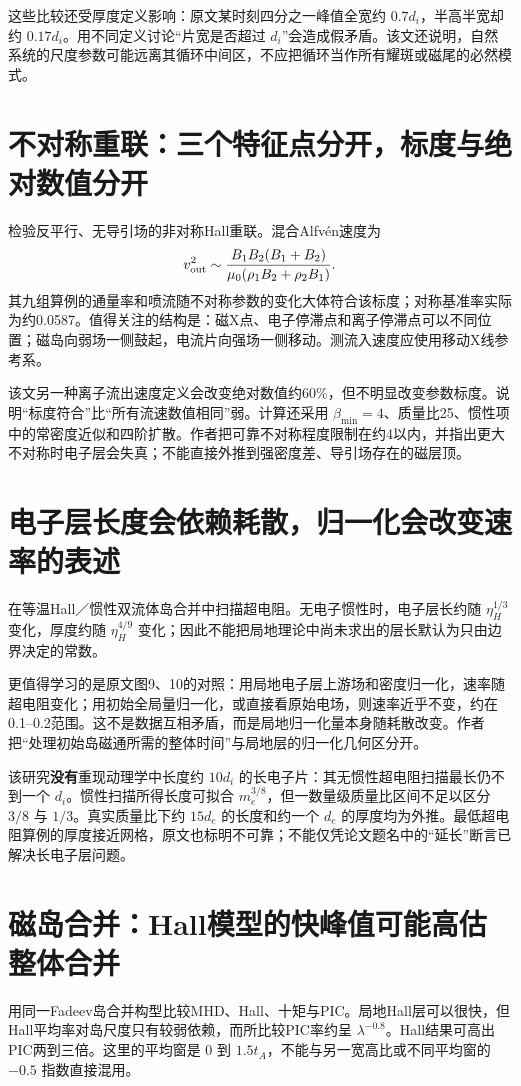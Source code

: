 这些比较还受厚度定义影响：原文某时刻四分之一峰值全宽约 $0.7d_i$，半高半宽却约 $0.17d_i$。用不同定义讨论“片宽是否超过 $d_i$”会造成假矛盾。该文还说明，自然系统的尺度参数可能远离其循环中间区，不应把循环当作所有耀斑或磁尾的必然模式。

\section{不对称重联：三个特征点分开，标度与绝对数值分开}
\citet{Cassak2008}检验反平行、无导引场的非对称Hall重联。混合Alfvén速度为
\begin{equation}
v_{\rm out}^2\sim\frac{B_1B_2(B_1+B_2)}{\mu_0(\rho_1B_2+\rho_2B_1)}.
\end{equation}
其九组算例的通量率和喷流随不对称参数的变化大体符合该标度；对称基准率实际为约0.0587。值得关注的结构是：磁X点、电子停滞点和离子停滞点可以不同位置；磁岛向弱场一侧鼓起，电流片向强场一侧移动。测流入速度应使用移动X线参考系。

该文另一种离子流出速度定义会改变绝对数值约60\%，但不明显改变参数标度。说明“标度符合”比“所有流速数值相同”弱。计算还采用 $\beta_{\min}=4$、质量比25、惯性项中的常密度近似和四阶扩散。作者把可靠不对称程度限制在约4以内，并指出更大不对称时电子层会失真；不能直接外推到强密度差、导引场存在的磁层顶。

\section{电子层长度会依赖耗散，归一化会改变速率的表述}
\citet{Sullivan2009}在等温Hall／惯性双流体岛合并中扫描超电阻。无电子惯性时，电子层长约随 $\eta_H^{1/3}$ 变化，厚度约随 $\eta_H^{4/9}$ 变化；因此不能把局地理论中尚未求出的层长默认为只由边界决定的常数。

更值得学习的是原文图9、10的对照：用局地电子层上游场和密度归一化，速率随超电阻变化；用初始全局量归一化，或直接看原始电场，则速率近乎不变，约在0.1--0.2范围。这不是数据互相矛盾，而是局地归一化量本身随耗散改变。作者把“处理初始岛磁通所需的整体时间”与局地层的归一化几何区分开。

该研究\textbf{没有}重现动理学中长度约 $10d_i$ 的长电子片：其无惯性超电阻扫描最长仍不到一个 $d_i$。惯性扫描所得长度可拟合 $m_e^{3/8}$，但一数量级质量比区间不足以区分 $3/8$ 与 $1/3$。真实质量比下约 $15d_e$ 的长度和约一个 $d_e$ 的厚度均为外推。最低超电阻算例的厚度接近网格，原文也标明不可靠；不能仅凭论文题名中的“延长”断言已解决长电子层问题。

\section{磁岛合并：Hall模型的快峰值可能高估整体合并}
\citet{Ng2015}用同一Fadeev岛合并构型比较MHD、Hall、十矩与PIC。局地Hall层可以很快，但Hall平均率对岛尺度只有较弱依赖，而所比较PIC率约呈 $\lambda^{-0.8}$。Hall结果可高出PIC两到三倍。这里的平均窗是 $0$ 到 $1.5t_A$，不能与另一宽高比或不同平均窗的 $-0.5$ 指数直接混用。

